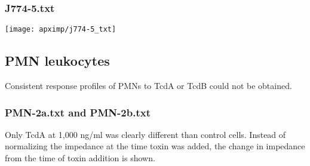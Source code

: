 \subsubsection{J774-5.txt}

\begin{knitrout}
\color{fgcolor}\begin{kframe}
\begin{alltt}
 \hlkwb{=}   \hlstd{=} \hlstd{)}
 \hlkwb{=}  \hlstd{(}\hlopt{-}\hlstd{,} \hlstd{))}
 \hlkwb{=}   \hlstd{=} \hlstd{(}\hlopt{-}\hlstd{,} \hlstd{))}
 \hlkwb{=}   \hlstd{=} \hlstd{(}\hlopt{-}\hlstd{,} \hlstd{))}
  \hlstd{=} \hlstd{)}
\end{alltt}
\end{kframe}
\texttt{[image: apximp/j774-5\_txt]} 

\end{knitrout}



\subsection{PMN leukocytes}\label{S:PMNs}

Consistent response profiles of PMNs to TcdA or TcdB could not be obtained.

\subsubsection{PMN-2a.txt and PMN-2b.txt}

Only TcdA at 1,000 ng/ml was clearly different than control cells. Instead of
normalizing the impedance at the time toxin was added, the change in impedance
from the time of toxin addition is shown.


